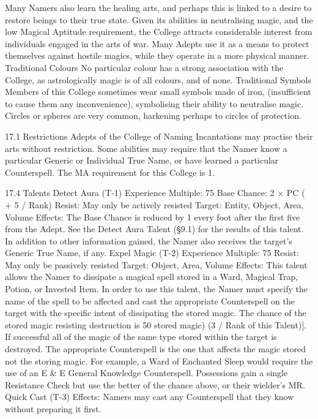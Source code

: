 \documentclass[a4paper]{article}
\begin{document}
\begin{multicols}{3}
Many Namers also learn the healing arts, and perhaps this is linked to a desire to restore beings to
their true state.
Given its abilities in neutralising magic, and the
low Magical Aptitude requirement, the College
attracts considerable interest from individuals
engaged in the arts of war. Many Adepts use it as a
means to protect themselves against hostile magics,
while they operate in a more physical manner.
Traditional Colours
No particular colour has a strong association with
the College, as astrologically magic is of all colours, and of none.
Traditional Symbols
Members of this College sometimes wear small
symbols made of iron, (insufficient to cause them
any inconvenience), symbolising their ability to
neutralise magic. Circles or spheres are very common, harkening perhaps to circles of protection.

17.1 Restrictions
Adepts of the College of Naming Incantations may
practise their arts without restriction. Some abilities may require that the Namer know a particular
Generic or Individual True Name, or have learned
a particular Counterspell.
The MA requirement for this College is 1.

17.4 Talents
Detect Aura (T-1)
Experience Multiple: 75
Base Chance: 2 × PC ( + 5 / Rank)
Resist: May only be actively resisted
Target: Entity, Object, Area, Volume
Effects: The Base Chance is reduced by 1%
every foot after the first five from the Adept. See
the Detect Aura Talent (§9.1) for the results of this
talent. In addition to other information gained, the
Namer also receives the target’s Generic True
Name, if any.
Expel Magic (T-2)
Experience Multiple: 75
Resist: May only be passively resisted
Target: Object, Area, Volume
Effects: This talent allows the Namer to dissipate a
magical spell stored in a Ward, Magical Trap,
Potion, or Invested Item. In order to use this talent,
the Namer must specify the name of the spell to be
affected and cast the appropriate Counterspell on
the target with the specific intent of dissipating the
stored magic. The chance of the stored magic resisting destruction is 50%
stored magic) (3 / Rank of this Talent)]. If successful all of the magic of the same type stored within
the target is destroyed. The appropriate Counterspell is the one that affects the magic stored not the
storing magic. For example, a Ward of Enchanted
Sleep would require the use of an E & E General
Knowledge Counterspell. Possessions gain a single
Resistance Check but use the better of the chance
above, or their wielder’s MR.
Quick Cast (T-3)
Effects: Namers may cast any Counterspell that
they know without preparing it first.


\end{multicols}
\end{document}
